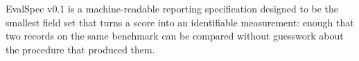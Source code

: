 \documentclass[11pt]{article}
\begin{document}
%
%
%

EvalSpec v0.1 is a machine-readable reporting specification designed to be
the smallest field set that turns a score into an identifiable measurement:
enough that two records on the same benchmark can be compared without
guesswork about the procedure that produced them.
\end{document}
